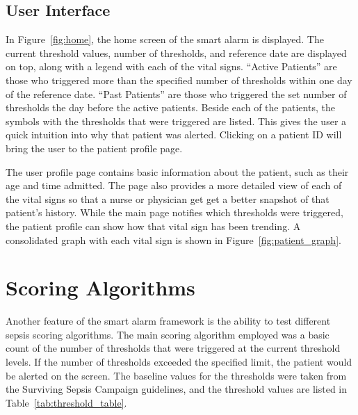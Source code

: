 \documentclass{sig-alternate}
\begin{document}
\vspace{10pt}
\subsection{User Interface}
\label{subsec:ui}
\vspace{10pt}

In Figure~\ref{fig:home}, the home screen of the smart alarm is displayed.  The current threshold values, number of thresholds, and reference date are displayed on top, along with a legend with each of the vital signs.  ``Active Patients'' are those who triggered more than the specified number of thresholds within one day of the reference date. ``Past Patients'' are those who triggered the set number of thresholds the day before the active patients.  Beside each of the patients, the symbols with the thresholds that were triggered are listed.  This gives the user a quick intuition into why that patient was alerted.  Clicking on a patient ID will bring the user to the patient profile page.

The user profile page contains basic information about the patient, such as their age and time admitted.  The page also provides a more detailed view of each of the vital signs so that a nurse or physician get get a better snapshot of that patient's history.  While the main page notifies which thresholds were triggered, the patient profile can show how that vital sign has been trending. A consolidated graph with each vital sign is shown in Figure~\ref{fig:patient_graph}.

\vspace{10pt}
\section{Scoring Algorithms}
\vspace{10pt}
\label{sec:scoring}

Another feature of the smart alarm framework is the ability to test different sepsis scoring algorithms.  The main scoring algorithm employed was a basic count of the number of thresholds that were triggered at the current threshold levels.  If the number of thresholds exceeded the specified limit, the patient would be alerted on the screen.  The baseline values for the thresholds were taken from the Surviving Sepsis Campaign guidelines, and the threshold values are listed in Table~\ref{tab:threshold_table}.  
\end{document}
